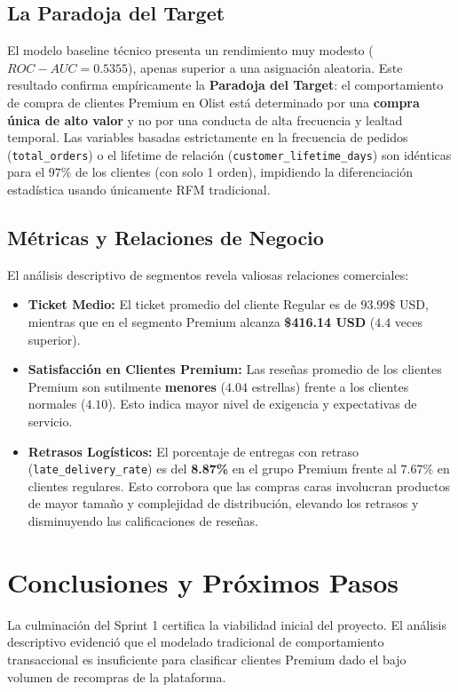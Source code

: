 \documentclass[journal,letterpaper]{IEEEtran}
\begin{document}
\subsection{La Paradoja del Target}
El modelo baseline técnico presenta un rendimiento muy modesto ($ROC-AUC = 0.5355$), apenas superior a una asignación aleatoria. Este resultado confirma empíricamente la \textbf{Paradoja del Target}: el comportamiento de compra de clientes Premium en Olist está determinado por una \textbf{compra única de alto valor} y no por una conducta de alta frecuencia y lealtad temporal. Las variables basadas estrictamente en la frecuencia de pedidos (\texttt{total\_orders}) o el lifetime de relación (\texttt{customer\_lifetime\_days}) son idénticas para el $97\%$ de los clientes (con solo 1 orden), impidiendo la diferenciación estadística usando únicamente RFM tradicional.

\subsection{Métricas y Relaciones de Negocio}
El análisis descriptivo de segmentos revela valiosas relaciones comerciales:
\begin{itemize}
    \item \textbf{Ticket Medio:} El ticket promedio del cliente Regular es de $93.99\$$ USD, mientras que en el segmento Premium alcanza \textbf{\$416.14 USD} ($4.4$ veces superior).
    \item \textbf{Satisfacción en Clientes Premium:} Las reseñas promedio de los clientes Premium son sutilmente \textbf{menores} ($4.04$ estrellas) frente a los clientes normales ($4.10$). Esto indica mayor nivel de exigencia y expectativas de servicio.
    \item \textbf{Retrasos Logísticos:} El porcentaje de entregas con retraso (\texttt{late\_delivery\_rate}) es del \textbf{8.87\%} en el grupo Premium frente al $7.67\%$ en clientes regulares. Esto corrobora que las compras caras involucran productos de mayor tamaño y complejidad de distribución, elevando los retrasos y disminuyendo las calificaciones de reseñas.
\end{itemize}

\section{Conclusiones y Próximos Pasos}
La culminación del Sprint 1 certifica la viabilidad inicial del proyecto. El análisis descriptivo evidenció que el modelado tradicional de comportamiento transaccional es insuficiente para clasificar clientes Premium dado el bajo volumen de recompras de la plataforma.
\end{document}
